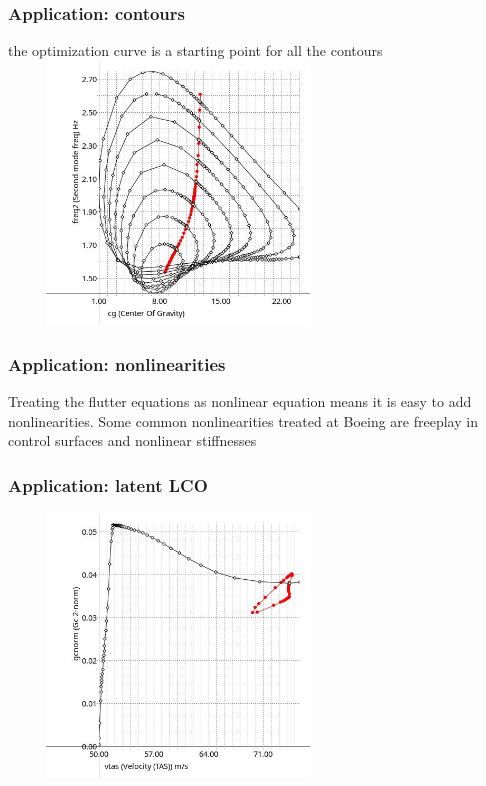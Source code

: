\documentclass{beamer}
\begin{document}
\begin{frame}
	\frametitle{Application: contours}
	the optimization curve is a starting point for all the contours
		\includegraphics[height=7cm,width=9cm]{contour.jpg}
\end{frame}

\begin{frame}
	\frametitle{Application: nonlinearities}
	Treating the flutter equations as nonlinear equation means it is
	easy to add nonlinearities. Some common nonlinearities treated at
	Boeing are freeplay in control surfaces and nonlinear stiffnesses
\end{frame}



\begin{frame}
	\frametitle{Application: latent LCO}
		\includegraphics[height=7cm,width=9cm]{latent.jpg}
\end{frame}
\end{document}
